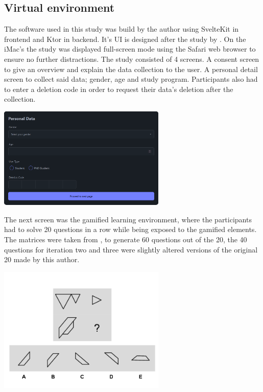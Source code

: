 \subsection{Virtual environment}
The software used in this study was build by the author using SvelteKit in frontend and Ktor in backend. It's UI is designed after the study by \textcite{albuquerqueDoesGenderStereotype2017}.
On the iMac's the study was displayed full-screen mode using the Safari web browser to ensure no further distractions. The study consisted of 4 screens.
A consent screen to give an overview and explain the data collection to the user.
A personal detail screen to collect said data; gender, age and study program. Participants also had to enter a deletion code in order to request their data's deletion after the collection.
\begin{minipage}{\textwidth}
  \includegraphics[width=0.6\textwidth]{img/details.png}
  \label{fig:figureDetails}
\end{minipage}
The next screen was the gamified learning environment, where the participants had to solve 20 questions in a row while being exposed to the gamified elements.
The matrices were taken from \textcite{albuquerqueDoesGenderStereotype2017}, to generate 60 questions out of the 20, the 40 questions for iteration two and three were slightly altered versions of the original 20 made by this author.
\begin{minipage}{\textwidth}
  \includegraphics[width=0.6\textwidth]{img/q-17.png}
  \label{fig:figureMatrix}
\end{minipage}
